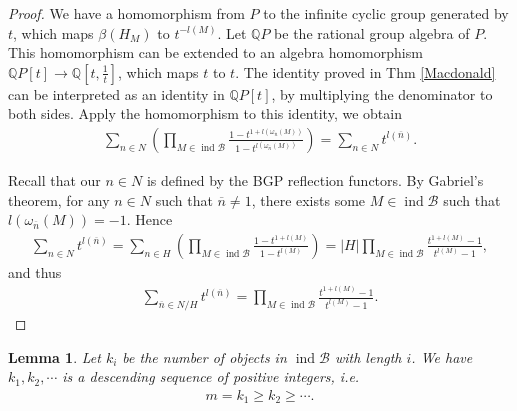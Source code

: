 \documentclass[12pt]{amsart}
\newtheorem{lemma}[theorem]{Lemma}
\begin{document}
\begin{proof}
    We have a homomorphism from $P$ to the infinite cyclic group generated by $t$, which maps $\beta(H_M)$ to $t^{-l(M)}$.
    Let $\mathbb{Q}P$ be the rational group algebra of $P$.
    This homomorphism can be extended to an algebra homomorphism $\mathbb{Q}P[t]\rightarrow \mathbb{Q}[t,\frac{1}{t}]$, which maps $t$ to $t$.
    The identity proved in Thm \ref{Macdonald} can be interpreted as an identity in $\mathbb{Q}P[t]$, by multiplying the denominator to both sides.
    Apply the homomorphism to this identity, we obtain
    \begin{align*}
        \sum_{n\in N}(\prod_{M\in \operatorname{ind}\mathcal{B}} \frac{1-t^{1+l(\omega_{\overline{n}}(M))}}{1-t^{l(\omega_{\overline{n}}(M))}}) = \sum_{n\in N} t^{l(\overline{n})}.
    \end{align*}

    Recall that our $n\in N$ is defined by the BGP reflection functors. 
    By Gabriel's theorem, for any $n\in N$ such that $\overline{n}\neq 1$, there exists some $M\in \operatorname{ind}\mathcal{B}$ such that $l(\omega_{\overline{n}}(M)) = -1$.
    Hence
    \begin{align*}
        \sum_{n\in N} t^{l(\overline{n})} =  \sum_{n\in H}(\prod_{M\in \operatorname{ind}\mathcal{B}} \frac{1-t^{1+l(M)}}{1-t^{l(M)}}) = |H| \prod_{M\in \operatorname{ind}\mathcal{B}} \frac{t^{1+l(M)}-1}{t^{l(M)}-1},
    \end{align*}
    and thus 
    \begin{align*}
        \sum_{\overline{n}\in N/H} t^{l(\overline{n})} = \prod_{M\in \operatorname{ind}\mathcal{B}} \frac{t^{1+l(M)}-1}{t^{l(M)}-1}.
    \end{align*}
\end{proof}

\begin{lemma}\label{k1k2}
    Let $k_i$ be the number of objects in $ \operatorname{ind}\mathcal{B}$ with length $i$.
    We have $k_1,k_2,\cdots$ is a descending sequence of positive integers, i.e.
\begin{align*}
   m= k_1 \geq k_2  \geq \cdots .
\end{align*}
\end{lemma}
\end{document}
